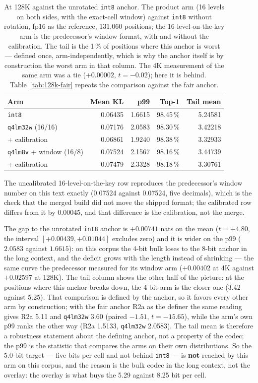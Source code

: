 \documentclass[10pt,twocolumn]{article}
\begin{document}
\begin{table}[t]
\centering
\footnotesize
\caption{At 128K against the unrotated \texttt{int8} anchor. The product arm (16 levels on both sides, with the exact-cell window) against \texttt{int8} without rotation, fp16 as the reference, 131,060 positions; the 16-level-on-the-key arm is the predecessor's window format, with and without the calibration. The tail is the 1\,\% of positions where this anchor is worst --- defined once, arm-independently, which is why the anchor itself is by construction the worst arm in that column. The 4K measurement of the same arm was a tie ($+0.00002$, $t = -0.02$); here it is behind. Table~\ref{tab:128k-fair} repeats the comparison against the fair anchor.}
\label{tab:128k}
\begin{tabular}{@{}lrrrr@{}}
\toprule
Arm & Mean KL & p99 & Top-1 & Tail mean \\
\midrule
\texttt{int8} & 0.06435 & 1.6615 & 98.45\,\% & 5.24581 \\
\texttt{q4lm32w} (16/16) & 0.07176 & 2.0583 & 98.30\,\% & 3.42218 \\
\quad + calibration & 0.06861 & 1.9240 & 98.38\,\% & 3.32933 \\
\texttt{q4lm8v} + window (16/8) & 0.07524 & 2.1567 & 98.16\,\% & 3.44739 \\
\quad + calibration & 0.07479 & 2.3328 & 98.18\,\% & 3.30761 \\
\bottomrule
\end{tabular}
\end{table}

The uncalibrated 16-level-on-the-key row reproduces the predecessor's window number on this text exactly (0.07524 against 0.07524, five decimals), which is the check that the merged build did not move the shipped format; the calibrated row differs from it by 0.00045, and that difference is the calibration, not the merge.

The gap to the unrotated \texttt{int8} anchor is $+0.00741$ nats on the mean ($t = +4.80$, the interval $[+0.00439, +0.01044]$ excludes zero) and it is wider on the p99 ($2.0583$ against $1.6615$): on this corpus the 4-bit bulk loses to the 8-bit anchor in the long context, and the deficit grows with the length instead of shrinking --- the same curve the predecessor measured for its window arm ($+0.00402$ at 4K against $+0.02597$ at 128K). The tail column shows the other half of the picture: at the positions where this anchor breaks down, the 4-bit arm is the closer one (3.42 against 5.25). That comparison is defined by the anchor, so it favors every other arm by construction; with the fair anchor R2a as the definer the same reading gives R2a 5.11 and \texttt{q4lm32w} 3.60 (paired $-1.51$, $t = -15.65$), while the arm's own p99 ranks the other way (R2a 1.5133, \texttt{q4lm32w} 2.0583). The tail mean is therefore a robustness statement about the defining anchor, not a property of the codec; the p99 is the statistic that compares the arms on their own distributions. So the 5.0-bit target --- five bits per cell and not behind \texttt{int8} --- is \textbf{not} reached by this arm on this corpus, and the reason is the bulk codec in the long context, not the overlay: the overlay is what buys the 5.29 against 8.25 bit per cell.
\end{document}
